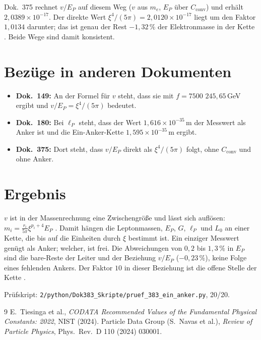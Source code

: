 Dok.~375 rechnet $v/E_P$ auf diesem Weg ($v$ aus $m_e$, $E_P$ über $C_{\text{conv}}$)
und erhält $2{,}0389\times10^{-17}$. Der direkte Wert $\xi^4/(5\pi)=2{,}0120\times10^{-17}$
liegt um den Faktor $1{,}0134$ darunter; das ist genau der Rest $-1{,}32\,\%$ der
Elektronmasse in der Kette \KM. Beide Wege sind damit konsistent.

\section{Bezüge in anderen Dokumenten}
\begin{itemize}
\item \textbf{Dok.~149:} An der Formel für $v$ steht, dass sie mit $f=7500$
  $245{,}65$\,GeV ergibt und $v/E_P=\xi^4/(5\pi)$ bedeutet.
\item \textbf{Dok.~180:} Bei $\ell_P$ steht, dass der Wert $1{,}616\times10^{-35}$\,m
  der Messwert als Anker ist und die Ein-Anker-Kette $1{,}595\times10^{-35}$\,m ergibt.
\item \textbf{Dok.~375:} Dort steht, dass $v/E_P$ direkt als $\xi^4/(5\pi)$ folgt, ohne
  $C_{\text{conv}}$ und ohne Anker.
\end{itemize}

\section{Ergebnis}
$v$ ist in der Massenrechnung eine Zwischengröße und lässt sich auflösen:
$m_i=\frac{r_i}{5\pi}\xi^{p_i+4}E_P$ \BM. Damit hängen die Leptonmassen, $E_P$, $G$,
$\ell_P$ und $L_0$ an einer Kette, die bis auf die Einheiten durch $\xi$ bestimmt ist.
Ein einziger Messwert genügt als Anker; welcher, ist frei. Die Abweichungen von
$0{,}2$ bis $1{,}3\,\%$ in $E_P$ sind die bare-Reste der Leiter und der Beziehung
$v/E_P$ ($-0{,}23\,\%$), keine Folge eines fehlenden Ankers. Der Faktor $10$ in dieser
Beziehung ist die offene Stelle der Kette \SM.

\medskip\noindent Prüfskript: \texttt{2/python/Dok383\_Skripte/pruef\_383\_ein\_anker.py}, 20/20.

\begin{thebibliography}{9}
 E.~Tiesinga et al., \emph{CODATA Recommended Values of the
  Fundamental Physical Constants: 2022}, NIST (2024).
 Particle Data Group (S.~Navas et al.), \emph{Review of Particle
  Physics}, Phys.\ Rev.\ D 110 (2024) 030001.
\end{thebibliography}
